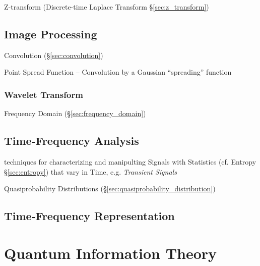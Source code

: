 \fist Z-transform (Discrete-time Laplace Transform \S\ref{sec:z_transform})



\subsection{Image Processing}\label{sec:image_processing}

Convolution (\S\ref{sec:convolution})

Point Spread Function -- Convolution by a Gaussian ``spreading'' function



\subsubsection{Wavelet Transform}\label{sec:wavelet_transform}

Frequency Domain (\S\ref{sec:frequency_domain})



\subsection{Time-Frequency Analysis}\label{sec:time_frequency_analysis}

techniques for characterizing and manipulting Signals with Statistics (cf.
Entropy \S\ref{sec:entropy}) that vary in Time, e.g. \emph{Transient Signals}

\fist Quasiprobability Distributions
(\S\ref{sec:quasiprobability_distribution})



\subsection{Time-Frequency Representation}
\label{sec:time_frequency_representation}



\section{Quantum Information Theory}\label{sec:quantum_information_theory}

